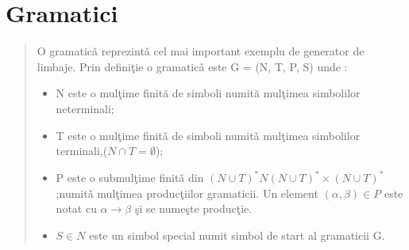 \section{Gramatici}
\begin{quotation}
 O gramatic\v a reprezint\v a cel mai important exemplu de generator de limbaje. Prin defini\c tie o gramatic\v a este G = (N, T, P, S) unde :
 \begin{itemize}
 \item {N este o mulţime finită de simboli numită mulţimea simbolilor neterminali;}
 \item {T este o mul\c time finit\v a de simboli numit\v a mul\c timea simbolilor terminali,($N\cap T=\emptyset$);}
 \item {P este o submul\c time finit\v a din $(N\cup T)^{*}N(N\cup T)^{*}\times(N\cup T)^{*} $;numit\v a mul\c timea produc\c tiilor gramaticii. Un element $(\alpha,\beta)\in P$ este notat cu $\alpha \rightarrow \beta$ \c si se nume\c ste produc\c tie.  
 }
 \item {$S \in N $ este un simbol special numit simbol de start al gramaticii G.}

\end{itemize}  
\end{quotation}
